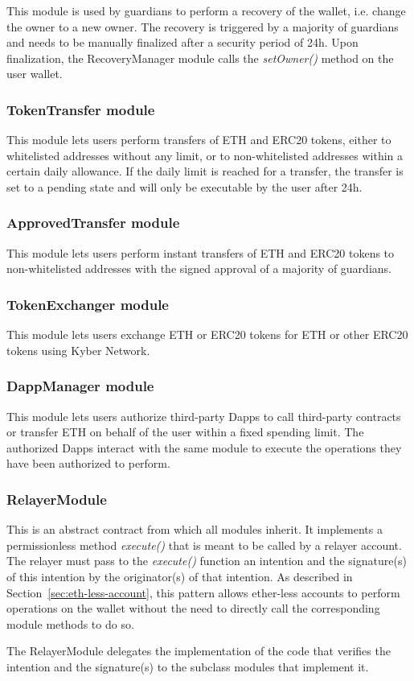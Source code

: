 \documentclass[12pt]{article}
\begin{document}
This module is used by guardians to perform a recovery of the wallet, i.e. change the owner to a new owner. The recovery is triggered by a majority of guardians and needs to be manually finalized after a security period of 24h. Upon finalization, the RecoveryManager module calls the \emph{setOwner()} method on the user wallet.

\subsubsection{TokenTransfer module}

This module lets users perform transfers of ETH and ERC20 tokens, either to whitelisted addresses without any limit, or to non-whitelisted addresses within a certain daily allowance. If the daily limit is reached for a transfer, the transfer is set to a pending state and will only be executable by the user after 24h.

\subsubsection{ApprovedTransfer module}

This module lets users perform instant transfers of ETH and ERC20 tokens to non-whitelisted addresses with the signed approval of a majority of guardians.

\subsubsection{TokenExchanger module}

This module lets users exchange ETH or ERC20 tokens for ETH or other ERC20 tokens using Kyber Network.

\subsubsection{DappManager module}

This module lets users authorize third-party Dapps to call third-party contracts or transfer ETH on behalf of the user within a fixed spending limit. The authorized Dapps interact with the same module to execute the operations they have been authorized to perform.

\subsubsection{RelayerModule}

This is an abstract contract from which all modules inherit. It implements a permissionless method \emph{execute()} that is meant to be called by a relayer account. The relayer must pass to the \emph{execute()} function an intention and the signature(s) of this intention by the originator(s) of that intention. As described in Section~\ref{sec:eth-less-account}, this pattern allows ether-less accounts to perform operations on the wallet without the need to directly call the corresponding module methods to do so.

The RelayerModule delegates the implementation of the code that verifies the intention and the signature(s) to the subclass modules that implement it.
\end{document}
